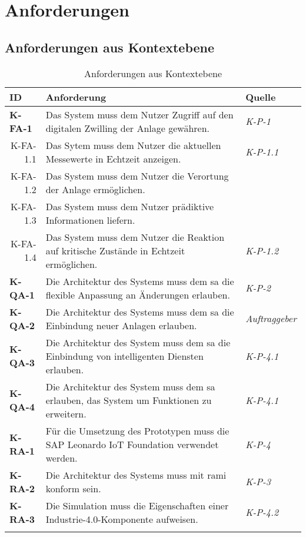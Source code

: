 \newpage
\appendix


\newpage
\section{Anforderungen}

\subsection{Anforderungen aus Kontextebene} \label{anfkontext}
\begin{table}[ht!]
  \begin{tabularx}{\textwidth}{@{}lXp{2cm}@{}}
      \toprule
      ID                & Anforderung & Quelle \\
      \midrule
      \textbf{K-FA-1}              &   Das System muss dem Nutzer Zugriff auf den digitalen Zwilling der Anlage gewähren.  & \textit{K-P-1}                \\
      \multicolumn{1}{r}{K-FA-1.1} &  Das Sytem muss dem Nutzer die aktuellen Messewerte in Echtzeit anzeigen.    & \textit{K-P-1.1}\\
      \multicolumn{1}{r}{K-FA-1.2} & Das System muss dem Nutzer die Verortung der Anlage ermöglichen. \\
      \multicolumn{1}{r}{K-FA-1.3} & Das System muss dem Nutzer prädiktive Informationen liefern.\\
      \multicolumn{1}{r}{K-FA-1.4} & Das System muss dem Nutzer die Reaktion auf kritische Zustände in Echtzeit ermöglichen.  & \textit{K-P-1.2}\\
      \textbf{K-QA-1}              & Die Architektur des Systems muss dem \ac{sa} die flexible Anpassung an Änderungen erlauben.     & \textit{K-P-2}                \\
      \textbf{K-QA-2}              & Die Architektur des Systems muss dem \ac{sa} die Einbindung neuer Anlagen erlauben.           & \textit{Auftraggeber}                \\
      \textbf{K-QA-3}              &  Die Architektur des System muss dem \ac{sa} die Einbindung von intelligenten Diensten erlauben.  & \textit{K-P-4.1} \\
      \textbf{K-QA-4}              &  Die Architektur des System muss dem \ac{sa} erlauben, das System um Funktionen zu erweitern.  & \textit{K-P-4.1} \\
      \textbf{K-RA-1}              & Für die Umsetzung des Prototypen muss die SAP Leonardo IoT Foundation verwendet werden.       & \textit{K-P-4} \\
      \textbf{K-RA-2}              & Die Architektur des Systems muss mit \ac{rami} konform sein.      & \textit{K-P-3} \\
      \textbf{K-RA-3}              & Die Simulation muss die Eigenschaften einer Industrie-4.0-Komponente aufweisen.      & \textit{K-P-4.2} \\
      \addlinespace
      \bottomrule
  \end{tabularx}
  \caption{Anforderungen aus Kontextebene}
  \label{kontext_anforderungen}
\end{table}


